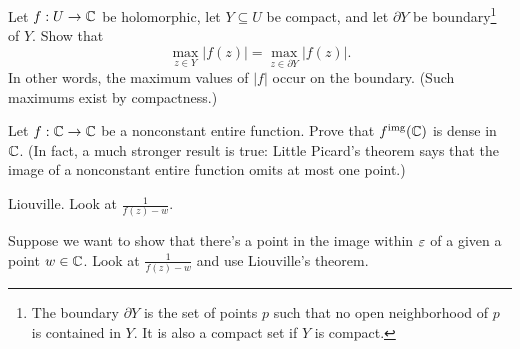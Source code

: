 
\begin{dproblem}
	Let $f : U \to \mathbb C$ be holomorphic, let $Y \subseteq U$ be compact,
	and let $\partial Y$ be boundary\footnote{
		The boundary $\partial Y$ is the set of points $p$
		such that no open neighborhood of $p$ is contained in $Y$.
		It is also a compact set if $Y$ is compact.
	} of $Y$.
	Show that
	\[ \max_{z \in Y} \left\lvert f(z) \right\rvert
		= \max_{z \in \partial Y} \left\lvert f(z) \right\rvert. \]
	In other words, the maximum values of $\left\lvert f \right\rvert$ occur
	on the boundary. (Such maximums exist by compactness.)
\end{dproblem}

\begin{problem}
	Let $f : \mathbb C \to \mathbb C$ be a nonconstant entire function.
	Prove that $f^{\text{img}}(\mathbb C)$ is dense in $\mathbb C$.
	(In fact, a much stronger result is true:
	Little Picard's theorem says that the image of a nonconstant
	entire function omits at most one point.)
	\begin{hint}
		Liouville. Look at $\frac{1}{f(z)-w}$.
	\end{hint}
	\begin{sol}
		Suppose we want to show that there's a point
		in the image within $\varepsilon$ of a given a point $w \in \mathbb C$.
		Look at $\frac{1}{f(z) - w}$ and use Liouville's theorem.
	\end{sol}
\end{problem}

%

